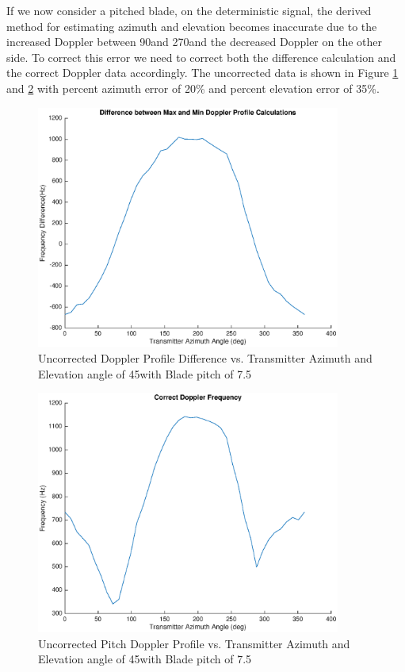 
If we now consider a pitched blade, on the deterministic signal, the derived method for estimating azimuth and elevation becomes inaccurate due to the increased Doppler between 90\textdegree \space and 270\textdegree \space and the decreased Doppler on the other side. To correct this error we need to correct both the difference calculation and the correct Doppler data accordingly. The uncorrected data is shown in Figure \ref{fig:diff_pitch_noCorrection} and \ref{fig:dop_pitch_noCorrection} with percent azimuth error of 20\% and percent elevation error of 35\%.

\begin{figure}
	\begin{center}
		\includegraphics[width=10cm]{images/results/difference_pitch_noCorrection.eps}
		\caption{Uncorrected Doppler Profile Difference vs. Transmitter Azimuth and Elevation angle of 45\textdegree with Blade pitch of 7.5\textdegree}
		\label{fig:diff_pitch_noCorrection}
	\end{center}
\end{figure}

\begin{figure}
	\begin{center}
		\includegraphics[width=10cm]{images/results/correct_dop_pitch_noCorrection.eps}
		\caption{Uncorrected Pitch Doppler Profile vs. Transmitter Azimuth and Elevation angle of 45\textdegree with Blade pitch of 7.5\textdegree}
		\label{fig:dop_pitch_noCorrection}
	\end{center}
\end{figure}

